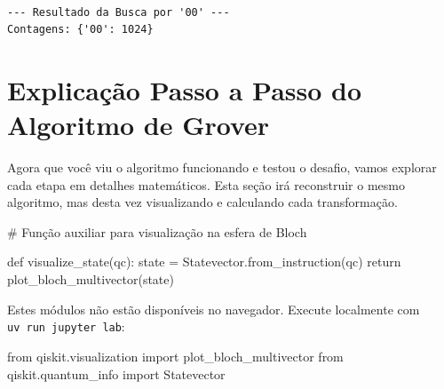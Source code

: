 \documentclass[
  brazilian,
]{report}
\newenvironment{Shaded}{\begin{snugshade}}{\end{snugshade}}
\newcommand{\ImportTok}[1]{\textcolor[rgb]{0.00,0.46,0.62}{#1}}
\newcommand{\NormalTok}[1]{\textcolor[rgb]{0.00,0.23,0.31}{#1}}
\begin{document}
\begin{verbatim}

--- Resultado da Busca por '00' ---
Contagens: {'00': 1024}
\end{verbatim}

\section{Explicação Passo a Passo do Algoritmo de
Grover}\label{explicauxe7uxe3o-passo-a-passo-do-algoritmo-de-grover}

Agora que você viu o algoritmo funcionando e testou o desafio, vamos
explorar cada etapa em detalhes matemáticos. Esta seção irá reconstruir
o mesmo algoritmo, mas desta vez visualizando e calculando cada
transformação.

\begin{Shaded}
\begin{Highlighting}[]
\NormalTok{\# Função auxiliar para visualização na esfera de Bloch}

\NormalTok{def visualize\_state(qc):}
\NormalTok{    state = Statevector.from\_instruction(qc)}
\NormalTok{    return plot\_bloch\_multivector(state)}
\end{Highlighting}
\end{Shaded}

\begin{tcolorbox}[enhanced jigsaw, arc=.35mm, bottomrule=.15mm, bottomtitle=1mm, breakable, colback=white, colbacktitle=quarto-callout-note-color!10!white, colframe=quarto-callout-note-color-frame, coltitle=black, left=2mm, leftrule=.75mm, opacityback=0, opacitybacktitle=0.6, rightrule=.15mm, title=\textcolor{quarto-callout-note-color}{\faInfo}\hspace{0.5em}{🔒 Imports do Qiskit (requerem execução local)}, titlerule=0mm, toprule=.15mm, toptitle=1mm]

Estes módulos não estão disponíveis no navegador. Execute localmente com
\texttt{uv\ run\ jupyter\ lab}:

\begin{Shaded}
\begin{Highlighting}[]
\ImportTok{from}\NormalTok{ qiskit.visualization }\ImportTok{import}\NormalTok{ plot\_bloch\_multivector}
\ImportTok{from}\NormalTok{ qiskit.quantum\_info }\ImportTok{import}\NormalTok{ Statevector}
\end{Highlighting}
\end{Shaded}

\end{tcolorbox}
\end{document}
